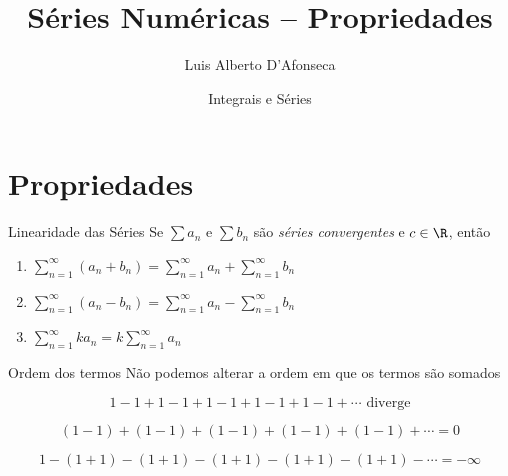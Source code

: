 
\usepackage{apresentacao}
\usepackage{mathconfig}
\usepackage{tabto}
\usepackage{cancel}

\graphicspath{{./figs/}}

\title {Séries Numéricas -- Propriedades}
\author{\large Luis Alberto D'Afonseca}
\date  {Integrais e Séries}



\begin{frame}
    \titlepage
\end{frame}

\section{Propriedades}

\begin{frame}{Linearidade das Séries}
  Se \(\sum a_n\) e \(\sum b_n\)
  são \emph{séries convergentes} e $c\in\R$,
  \pause
  então

  \vspace{\baselineskip}
  \begin{enumerate}[<+->]
    \setlength\itemsep{1em}
    \item \( \sum_{n=1}^\infty (a_n+b_n) =  \sum_{n=1}^\infty a_n +\sum_{n=1}^\infty b_n \)
    \item \( \sum_{n=1}^\infty (a_n-b_n) =  \sum_{n=1}^\infty a_n -\sum_{n=1}^\infty b_n \)
    \item \( \sum_{n=1}^\infty ka_n      = k\sum_{n=1}^\infty a_n \)
  \end{enumerate}
\end{frame}

\begin{frame}{Ordem dos termos}
  Não podemos alterar a ordem em que os termos são somados

  \pause
  \[
    1-1+1-1+1-1+1-1+1-1+\cdots \text{ diverge}
  \]

  \pause
  \[
    (1-1)+(1-1)+(1-1)+(1-1)+(1-1)+\cdots = 0
  \]

  \pause
  \[
    1-(1+1)-(1+1)-(1+1)-(1+1)-(1+1)-\cdots = -\infty
  \]
\end{frame}

